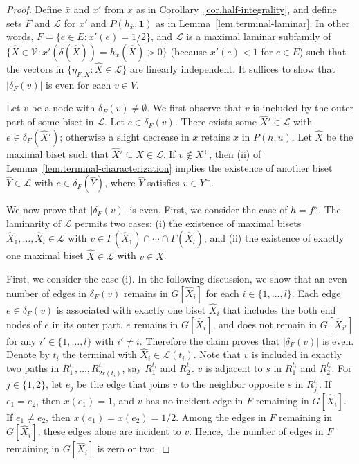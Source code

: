 \documentclass{article}
\newcommand{\Vfam}{\mathcal{V}}
\newcommand{\Lfam}{\mathcal{L}}
\newcommand{\allone}{\mathbf{1}}
\newcommand{\cut}{P}
\newcommand{\f}{f^{\kappa}}
\begin{document}
 \begin{proof}
  Define $\bar{x}$ and $x'$
from $x$ as in Corollary~\ref{cor.half-integrality},
and define sets $F$ and $\Lfam$ 
for $x'$ and $\cut(h_{\bar{x}},\allone)$
as in Lemma~\ref{lem.terminal-laminar}.
In other words,
$F=\{e \in E \colon x'(e) =1/2\}$,
and $\Lfam$ is a maximal laminar subfamily of 
$\{\hat{X} \in \Vfam \colon x'(\delta(\hat{X}))=
h_{\bar{x}}(\hat{X})>0\}$
(because $x'(e)<1$ for $e \in E$)
such that the vectors in $\{\eta_{F,\hat{X}} \colon \hat{X} \in \Lfam\}$
are linearly independent.
It suffices to show that $|\delta_F(v)|$ is even for each $v \in V$.

Let $v$ be a node with $\delta_{F}(v)\neq \emptyset$. 
We first observe that $v$ is included by the outer part of some biset in $\Lfam$.
Let $e \in \delta_{F}(v)$.
There exists some $\hat{X}' \in \Lfam$ with $e \in \delta_{F}(\hat{X}')$; otherwise 
a slight decrease in $x$ retains $x$ in $\cut(h,u)$.
Let $\hat{X}$ be the maximal biset such that $\hat{X}'\subseteq \hat{X} \in \Lfam$.
If $v \not\in X^+$, then (ii) of Lemma~\ref{lem.terminal-characterization} implies
the existence of another biset $\hat{Y} \in \Lfam$ with $e \in \delta_{F}(\hat{Y})$,
where $\hat{Y}$ satisfies $v \in Y^+$.

We now prove that $|\delta_F(v)|$ is even. First, we consider the case of $h=\f$.
The laminarity of $\Lfam$ permits two cases: 
(i) the existence of maximal bisets $\hat{X}_1,\ldots,\hat{X}_l \in \Lfam$
with $v \in \Gamma(\hat{X}_1)\cap \cdots \cap \Gamma(\hat{X}_l)$,
and (ii) 
the existence of exactly one maximal biset $\hat{X} \in \Lfam$ with
$v \in X$.

First, we consider the case (i).
In the following discussion,
we show that an even number of edges in $\delta_F(v)$ remains in $G[\hat{X}_i]$
for each $i \in \{1,\ldots,l\}$.
Each edge $e \in \delta_F(v)$ is associated with
exactly one biset $\hat{X}_i$ that includes the both end nodes of $e$ in its outer
part. 
$e$ remains in $G[\hat{X}_i]$, and does not remain in $G[\hat{X}_{i'}]$ 
for any $i' \in \{1,\ldots,l\}$ with $i' \neq i$.
Therefore the claim proves that $|\delta_F(v)|$ is even.
Denote by $t_i$ the terminal with $\hat{{X}}_i \in \Lfam(t_i)$.
Note that
$v$ is included in exactly two paths in $R^{t_i}_1,\ldots,R^{t_i}_{2r(t_i)}$,
say $R^{t_i}_1$ and $R^{t_i}_2$. 
$v$ is adjacent to $s$ in $R^{t_i}_1$ and $R^{t_i}_2$. 
For $j \in \{1,2\}$, let $e_j$ be the edge that joins $v$ to the neighbor opposite $s$ in $R^{t_i}_j$. 
If $e_1=e_2$, then $x(e_1)=1$, and $v$ has no incident edge in $F$ remaining in $G[\hat{X}_i]$.
If $e_1 \neq e_2$, then $x(e_1)=x(e_2)=1/2$. Among the edges in $F$ remaining in $G[\hat{X}_i]$,
these edges alone are incident to $v$.
Hence, the number of edges in $F$ remaining in $G[\hat{X}_i]$
is zero or two.


\end{proof}
\end{document}
